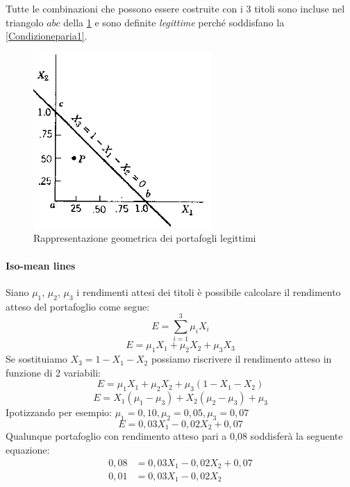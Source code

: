 Tutte le combinazioni che possono essere costruite con i 3 titoli sono incluse nel triangolo $abc$ della \ref{fig:geometric-rapresentation-of-portfolios} e sono definite\textit{ legittime} perché soddisfano la \ref{Condizioneparia1}.

\begin{figure}[h]
	\centering
	\includegraphics[width=0.4\linewidth]{"imgs/Geometric rapresentation of portfolios"}
	\caption{Rappresentazione geometrica dei portafogli legittimi}
	\label{fig:geometric-rapresentation-of-portfolios}
\end{figure}

\newpage

\paragraph{Iso-mean lines}
Siano $\mu_1$, $\mu_2$, $\mu_3$ i rendimenti attesi dei titoli è possibile calcolare il rendimento atteso del portafoglio come segue:
\begin{equation}
\label{key}
E= \displaystyle\sum_{i=1}^3 \mu_{i} X_{i}
\end{equation}
\begin{equation}
\label{key}
E= \mu_{1} X_{1}+\mu_{2} X_{2}+\mu_{3} X_{3}
\end{equation}
Se sostituiamo $X_{3}= 1- X_{1}- X_{2}$ possiamo riscrivere il rendimento atteso in funzione di 2 variabili: 
\begin{equation}
\label{key}
E= \mu_{1} X_{1}+\mu_{2} X_{2}+\mu_{3} (1- X_{1}- X_{2})
\nonumber
\end{equation}
\begin{equation}
\label{key}
E= X_{1}   (\mu_{1}-\mu_{3})+X_{2}   (\mu_{2}-\mu_{3})+\mu_{3}
\nonumber
\end{equation}
Ipotizzando per esempio: $\mu_{1}=0,10, \mu_{2}=0,05, \mu_{3}= 0,07$ 
\begin{equation}
\label{key}
E= 0,03    X_{1} -0,02    X_{2}+0,07
\nonumber
\end{equation}
Qualunque portafoglio con rendimento atteso pari a 0,08 soddisferà la seguente equazione: 
\begin{equation}
\begin{split}
0,08&= 0,03  X_{1} -0,02  X_{2}+0,07\\
0,01 &= 0,03  X_{1} -0,02  X_{2}
\nonumber
\end{split}
\end{equation}

